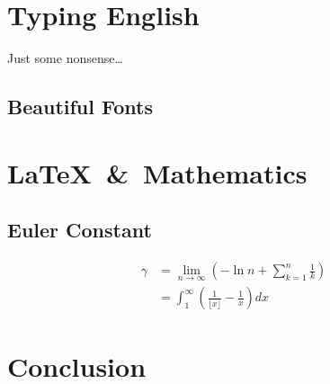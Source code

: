 \documentclass[UTF8,a4paper,twoside,zihao=-4]{ctexrep}
\begin{document}
\chapter{Typing English}
Just some nonsense\dots
\section{Beautiful Fonts}
\lipsum
\chapter{\LaTeX\ \&\ Mathematics}
\section{Euler Constant}
\[
\begin{aligned}
	\gamma&=\lim_{n\to\infty}\left(-\ln n+\sum_{k=1}^{n}\frac{1}{k}\right)\\
		   &=\int^{\infty}_{1}\left(\frac{1}{\lfloor x\rfloor}-\frac{1}{x}\right) dx
\end{aligned}
\]
\chapter{Conclusion}
\end{document}
